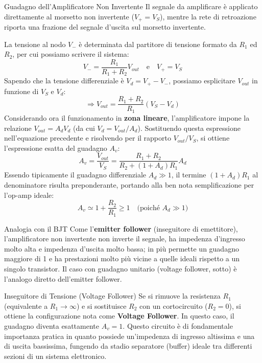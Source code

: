 \begin{teorema}{Guadagno dell'Amplificatore Non Invertente}
Il segnale da amplificare è applicato direttamente al morsetto non invertente ($V_+ = V_S$), mentre la rete di retroazione riporta una frazione del segnale d'uscita sul morsetto invertente.

La tensione al nodo $V_-$ è determinata dal partitore di tensione formato da $R_1$ ed $R_2$, per cui possiamo scrivere il sistema:
\[
    V_- = \frac{R_1}{R_1+R_2} V_{out} \quad \text{e} \quad V_+ = V_S
\]
Sapendo che la tensione differenziale è $V_d = V_+ - V_-$, possiamo esplicitare $V_{out}$ in funzione di $V_S$ e $V_d$:
\[
    \Rightarrow V_{out} = \frac{R_1+R_2}{R_1} (V_S - V_d)
\]
Considerando ora il funzionamento in \textbf{zona lineare}, l'amplificatore impone la relazione $V_{out} = A_d V_d$ (da cui $V_d = V_{out}/A_d$). Sostituendo questa espressione nell'equazione precedente e risolvendo per il rapporto $V_{out}/V_S$, si ottiene l'espressione esatta del guadagno $A_v$:
\[
    A_v = \frac{V_{out}}{V_S} = \frac{R_1+R_2}{R_2 + (1+A_d)R_1} A_d
\]
Essendo tipicamente il guadagno differenziale $A_d \gg 1$, il termine $(1+A_d)R_1$ al denominatore risulta preponderante, portando alla ben nota semplificazione per l'op-amp ideale:
\[
    \boxed{A_v \simeq 1 + \frac{R_2}{R_1} \ge 1} \quad \text{(poiché } A_d \gg 1\text{)}
\]
\end{teorema}

\begin{osservazione}{Analogia con il BJT}
    Come l'\textbf{emitter follower} (inseguitore di emettitore), l'amplificatore non invertente non inverte il segnale, ha impedenza d'ingresso molto alta e impedenza d'uscita molto bassa; in più permette un guadagno maggiore di 1 e ha prestazioni molto più vicine a quelle ideali rispetto a un singolo transistor. Il caso con guadagno unitario (voltage follower, sotto) è l'analogo diretto dell'emitter follower.
\end{osservazione}
\begin{osservazione}{Inseguitore di Tensione (Voltage Follower)}
    Se si rimuove la resistenza $R_1$ (equivalente a $R_1 \to \infty$) e si sostituisce $R_2$ con un cortocircuito ($R_2 = 0$), si ottiene la configurazione nota come \textbf{Voltage Follower}. In questo caso, il guadagno diventa esattamente $A_v = 1$. Questo circuito è di fondamentale importanza pratica in quanto possiede un'impedenza di ingresso altissima e una di uscita bassissima, fungendo da stadio separatore (buffer) ideale tra differenti sezioni di un sistema elettronico.
\end{osservazione}

